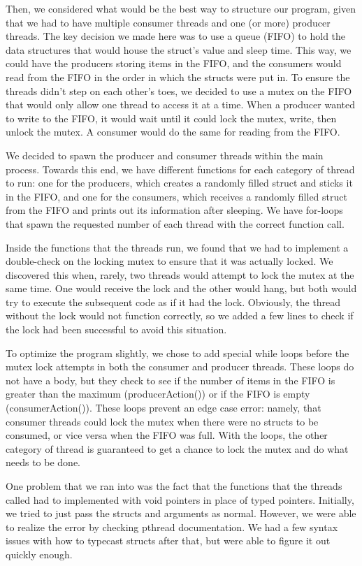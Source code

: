 \documentclass[letterpaper,10pt,titlepage]{article}
\begin{document}
Then, we considered what would be the best way to structure our program, given that we had to have multiple consumer threads and one (or more) producer threads.
The key decision we made here was to use a queue (FIFO) to hold the data structures that would house the struct's value and sleep time.
This way, we could have the producers storing items in the FIFO, and the consumers would read from the FIFO in the order in which the structs were put in.
To ensure the threads didn't step on each other’s toes, we decided to use a mutex on the FIFO that would only allow one thread to access it at a time.
When a producer wanted to write to the FIFO, it would wait until it could lock the mutex, write, then unlock the mutex.
A consumer would do the same for reading from the FIFO.

We decided to spawn the producer and consumer threads within the main process.
Towards this end, we have different functions for each category of thread to run: one for the producers, which creates a randomly filled struct and sticks it in the FIFO, and one for the consumers, which receives a randomly filled struct from the FIFO and prints out its information after sleeping.
We have for-loops that spawn the requested number of each thread with the correct function call.

Inside the functions that the threads run, we found that we had to implement a double-check on the locking mutex to ensure that it was actually locked.
We discovered this when, rarely, two threads would attempt to lock the mutex at the same time.
One would receive the lock and the other would hang, but both would try to execute the subsequent code as if it had the lock.
Obviously, the thread without the lock would not function correctly, so we added a few lines to check if the lock had been successful to avoid this situation.

To optimize the program slightly, we chose to add special while loops before the mutex lock attempts in both the consumer and producer threads.
These loops do not have a body, but they check to see if the number of items in the FIFO is greater than the maximum (producerAction()) or if the FIFO is empty (consumerAction()).
These loops prevent an edge case error: namely, that consumer threads could lock the mutex when there were no structs to be consumed, or vice versa when the FIFO was full.
With the loops, the other category of thread is guaranteed to get a chance to lock the mutex and do what needs to be done.

One problem that we ran into was the fact that the functions that the threads called had to implemented with void pointers in place of typed pointers.
Initially, we tried to just pass the structs and arguments as normal.
However, we were able to realize the error by checking pthread documentation.
We had a few syntax issues with how to typecast structs after that, but were able to figure it out quickly enough.
\end{document}
